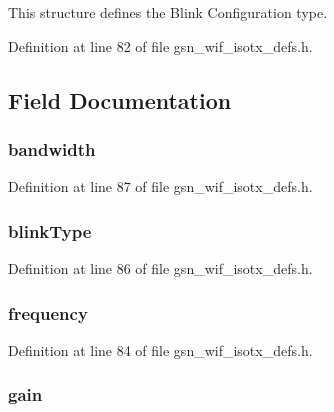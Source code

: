 This structure defines the Blink Configuration type. 

Definition at line 82 of file gsn\_\-wif\_\-isotx\_\-defs.h.



\subsection{Field Documentation}
\hypertarget{a00383_a548d910b6340cf4de833a896da2b35f6}{
\subsubsection[{bandwidth}]{ {\bf bandwidth}}}
\label{a00383_a548d910b6340cf4de833a896da2b35f6}


Definition at line 87 of file gsn\_\-wif\_\-isotx\_\-defs.h.

\hypertarget{a00383_a2136113b2c79a3867262b1f57e8bcb08}{
\subsubsection[{blinkType}]{ {\bf blinkType}}}
\label{a00383_a2136113b2c79a3867262b1f57e8bcb08}


Definition at line 86 of file gsn\_\-wif\_\-isotx\_\-defs.h.

\hypertarget{a00383_a52991657866650aa21f85b97e7d9168c}{
\subsubsection[{frequency}]{ {\bf frequency}}}
\label{a00383_a52991657866650aa21f85b97e7d9168c}


Definition at line 84 of file gsn\_\-wif\_\-isotx\_\-defs.h.

\hypertarget{a00383_a0f1b5772403f7bc9104194ca13b98ef4}{
\subsubsection[{gain}]{ {\bf gain}}}
\label{a00383_a0f1b5772403f7bc9104194ca13b98ef4}


